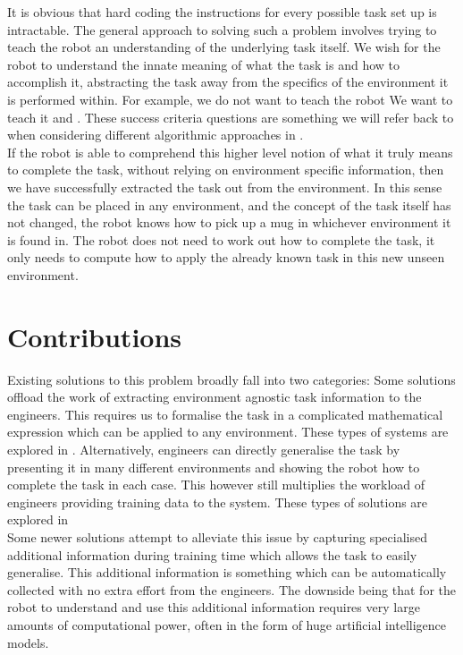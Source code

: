 It is obvious that hard coding the instructions for every possible task set up is intractable. The general approach to solving such a problem involves trying to teach the robot an understanding of the underlying task itself. We wish for the robot to understand the innate meaning of what the task is and how to accomplish it, abstracting the task away from the specifics of the environment it is performed within. For example, we do not want to teach the robot  We want to teach it  and . These success criteria questions are something we will refer back to when considering different algorithmic approaches in .\\

If the robot is able to comprehend this higher level notion of what it truly means to complete the task, without relying on environment specific information, then we have successfully extracted the task out from the environment. In this sense the task can be placed in any environment, and the concept of the task itself has not changed, the robot knows how to pick up a mug in whichever environment it is found in. The robot does not need to work out how to complete the task, it only needs to compute how to apply the already known task in this new unseen environment.

\section{Contributions}
Existing solutions to this problem broadly fall into two categories: Some solutions offload the work of extracting environment agnostic task information to the engineers. This requires us to formalise the task in a complicated mathematical expression which can be applied to any environment. These types of systems are explored in . Alternatively, engineers can directly generalise the task by presenting it in many different environments and showing the robot how to complete the task in each case. This however still multiplies the workload of engineers providing training data to the system. These types of solutions are explored in  \\
Some newer solutions attempt to alleviate this issue by capturing specialised additional information during training time which allows the task to easily generalise. This additional information is something which can be automatically collected with no extra effort from the engineers. The downside being that for the robot to understand and use this additional information requires very large amounts of computational power, often in the form of huge artificial intelligence models.\\

